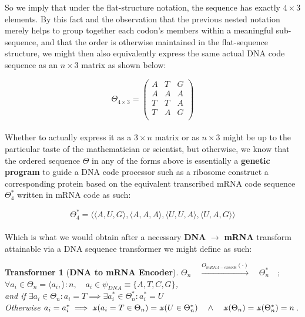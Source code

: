 \documentclass[a4paper, 18pt]{article} %
\newtheorem{transf}{Transformer}
\newcommand{\invpi}{\rotatebox[origin=c]{180}{$\pi$}}
\begin{document}
So we imply that under the flat-structure notation, the sequence has exactly $4 \times 3$ elements. By this fact and the observation that the previous nested notation merely helps to group together each codon's members within a meaningful sub-sequence, and that the order is otherwise maintained in the flat-sequence structure, we might then also equivalently express the same actual DNA code sequence as an $n \times 3$ matrix as shown below:

 \begin{equation}
\label{EQ5a}
\Theta_{4 \times 3} = \begin{pmatrix}
A& T& G\\
A& A& A\\
T& T& A\\
T& A & G \\
\end{pmatrix}
\end{equation}\\


Whether to actually express it as a $3 \times n$ matrix or as $n \times 3$ might be up to the particular taste of the mathematician or scientist, but otherwise, we know that the ordered sequence $\Theta$ in any of the forms above is essentially a \textbf{genetic program} to guide a DNA code processor such as a ribosome construct a corresponding protein based on the equivalent transcribed mRNA code sequence $\Theta_4^*$ written in mRNA code as such:


 \begin{equation}
\label{EQ6}
\Theta_4^* = \langle \langle A, U, G \rangle, \langle A, A, A \rangle, \langle U, U, A \rangle, \langle U, A, G \rangle \rangle
\end{equation}\\

Which is what we would obtain after a necessary \textbf{DNA} $\rightarrow$ \textbf{mRNA} transform attainable via a DNA sequence transformer we might define as such:\\


\begin{transf}[\textbf{DNA to mRNA Encoder}]
\label{TRANSF1}
$\Theta_n \quad \xrightarrow{O_{mRNA-encode}(\cdot)} \quad \Theta^*_n \quad;$\\
$\forall a_i \in \Theta_n = \langle a_i,\rangle:n, \quad a_i \in \psi_{DNA} \equiv \{A, T, C, G\}$,\\
and if $\exists a_i \in \Theta_n : a_i = T \implies \exists a_i^* \in \Theta^*_n: a_i^* = U$\\
Otherwise $a_i = a_i^* \implies \invpi(a_i = T \in \Theta_n) = \invpi(U \in \Theta^*_n) \quad \land \quad \invpi(\Theta_n) = \invpi(\Theta^*_n) = n$.

\end{transf}
\end{document}
